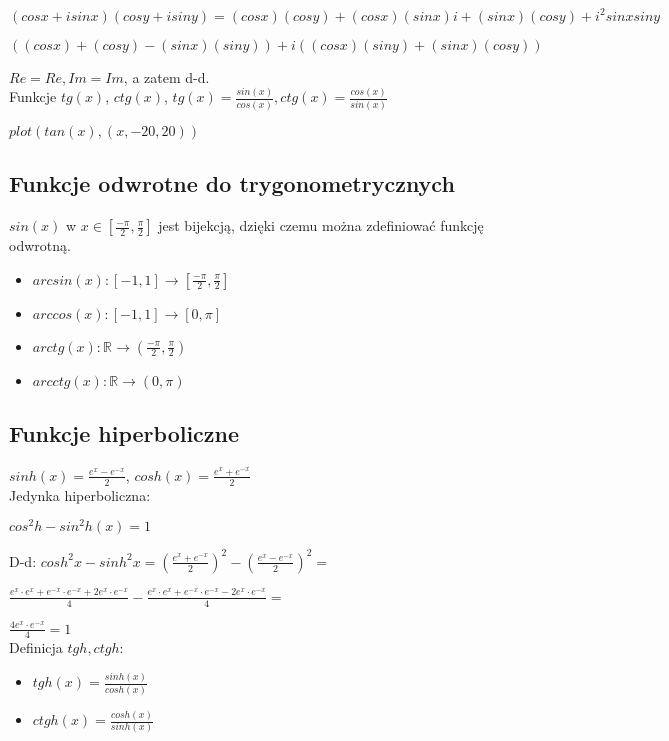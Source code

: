 \documentclass{article}
\theoremstyle{definition}
\theoremstyle{definition}
\theoremstyle{definition}
\theoremstyle{definition}
\begin{document}
$(cosx + isinx)(cosy + isiny)=(cosx) (cosy) + (cosx) (sinx) i + (sinx) (cosy) + i^2 sinx siny$

$((cosx)+(cosy)-(sinx)(siny))+i((cosx)(siny)+(sinx)(cosy))$

$Re = Re, Im=Im$, a zatem d-d.\\

Funkcje $tg(x)$, $ctg(x)$, $tg(x)=\frac{sin(x)}{cos(x)}, ctg(x)=\frac{cos(x)}{sin(x)}$

$plot(tan(x),(x,-20,20))$\\

\subsection{Funkcje odwrotne do trygonometrycznych}

$sin(x)$ w $x\in[\frac{-\pi}{2},\frac{\pi}{2}]$ jest bijekcją, dzięki czemu można zdefiniować funkcję odwrotną.

\begin{itemize}
    \item $arcsin(x): [-1,1]\rightarrow[\frac{-\pi}{2},\frac{\pi}{2}]$
    \item $arccos(x): [-1,1]\rightarrow[0,\pi]$
    \item $arctg(x): \mathbb{R}\rightarrow (\frac{-\pi}{2},\frac{\pi}{2})$
    \item $arcctg(x): \mathbb{R}\rightarrow (0,\pi)$
\end{itemize}

\subsection{Funkcje hiperboliczne}

$sinh(x)=\frac{e^x-e^{-x}}{2}$, $cosh(x)=\frac{e^x+e^{-x}}{2}$\\

Jedynka hiperboliczna:

\begin{center}
    $cos^2h-sin^2h(x)=1$
\end{center}

D-d:
$cosh^2{x}-sinh^2{x}=(\frac{e^x+e^{-x}}{2})^2-(\frac{e^x-e^{-x}}{2})^2=$

$\frac{e^x\cdot e^x + e^{-x}\cdot e^{-x} + 2e^x\cdot e^{-x}}{4}-\frac{e^x\cdot e^x + e^{-x}\cdot e^{-x} - 2e^x\cdot e^{-x}}{4}=$

$\frac{4 e^x \cdot e^{-x}}{4}=1$\\

Definicja $tgh, ctgh$:
\begin{itemize}
    \item $tgh(x)=\frac{sinh(x)}{cosh(x)}$
    \item $ctgh(x)=\frac{cosh(x)}{sinh(x)}$
\end{itemize}
\end{document}

